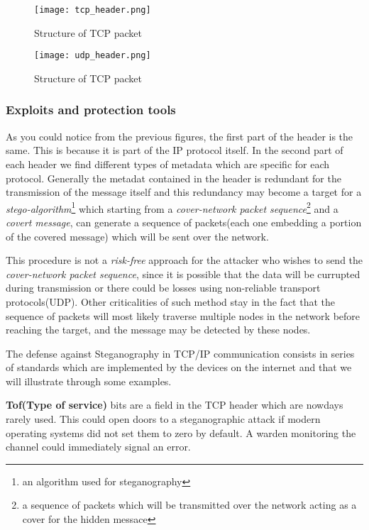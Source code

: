\documentclass[../../main.tex]{subfiles}
\begin{document}
    \begin{figure}[h]
        \centering
        \caption{Structure of TCP packet}
        \texttt{[image: tcp\_header.png]}
    \end{figure}

    \begin{figure}[h]
        \centering
        \caption{Structure of TCP packet}
        \texttt{[image: udp\_header.png]}
    \end{figure}

    \pagebreak

    \subsubsection{Exploits and protection tools}

    As you could notice from the previous figures, the first part of the header
    is the same. This is because it is part of the IP protocol itself.
    In the second part of each header we find different types of metadata which
    are specific for each protocol. Generally the metadat contained in the
    header is redundant for the transmission of the message itself and this 
    redundancy may become a target for a \emph{stego-algorithm}\footnote{an
    algorithm used for steganography} which starting from a \emph{cover-network
    packet sequence}\footnote{a sequence of packets which will be transmitted
    over the network acting as a cover for the hidden messace} and a
    \emph{covert message}, can generate a sequence of packets(each one embedding
    a portion of the covered message) which will be sent over the network.

    This procedure is not a \emph{risk-free} approach for the attacker who
    wishes to send the \emph{cover-network packet sequence}, since it is
    possible that the data will be currupted during transmission or there could
    be losses using non-reliable transport protocols(UDP).
    Other criticalities of such method stay in the fact that the sequence of
    packets will most likely traverse multiple nodes in the network before
    reaching the target, and the message may be detected by these nodes.

    The defense against Steganography in TCP/IP communication consists in 
    series of standards which are implemented by the devices on the internet and
    that we will illustrate through some examples.


    \textbf{Tof(Type of service)} bits are a field in the TCP header which are
    nowdays rarely used. This could open doors to a steganographic attack if
    modern operating systems did not set them to zero by default.
    A warden monitoring the channel could immediately signal an error.
\end{document}
